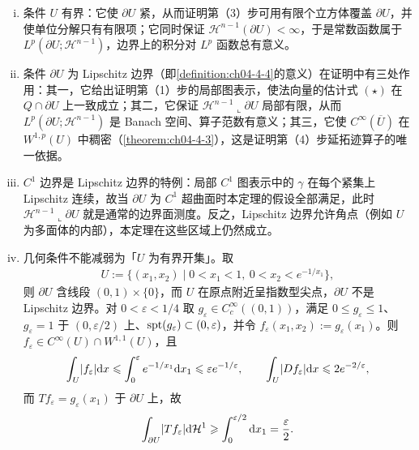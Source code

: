 \documentclass[../../main.tex]{subfiles}%
\begin{document}
\begin{remark}\label{remark:ch04-thm-4-6-条件}
\begin{enumerate}[(i)]
\item 条件 $U$ 有界：它使 $\partial U$ 紧，从而证明第（3）步可用有限个立方体覆盖 $\partial U$，并使单位分解只有有限项；它同时保证 $\mathcal{H}^{n-1}(\partial U)<\infty$，于是常数函数属于 $L^p(\partial U;\mathcal{H}^{n-1})$，边界上的积分对 $L^p$ 函数总有意义。
\item 条件 $\partial U$ 为 Lipschitz 边界（即\cref{definition:ch04-4-4}的意义）在证明中有三处作用：其一，它给出证明第（1）步的局部图表示，使法向量的估计式 $(\star)$ 在 $Q\cap\partial U$ 上一致成立；其二，它保证 $\mathcal{H}^{n-1}\llcorner\partial U$ 局部有限，从而 $L^p(\partial U;\mathcal{H}^{n-1})$ 是 Banach 空间、算子范数有意义；其三，它使 $C^\infty(\overline{U})$ 在 $W^{1,p}(U)$ 中稠密（\cref{theorem:ch04-4-3}），这是证明第（4）步延拓迹算子的唯一依据。 %
\item $C^1$ 边界是 Lipschitz 边界的特例：局部 $C^1$ 图表示中的 $\gamma$ 在每个紧集上 Lipschitz 连续，故当 $\partial U$ 为 $C^1$ 超曲面时本定理的假设全部满足，此时 $\mathcal{H}^{n-1}\llcorner\partial U$ 就是通常的边界面测度。反之，Lipschitz 边界允许角点（例如 $U$ 为多面体的内部），本定理在这些区域上仍然成立。
\item 几何条件不能减弱为「$U$ 为有界开集」。取
\begin{align*}
U:=\bigl\{(x_1,x_2)\mid0<x_1<1,\ 0<x_2<e^{-1/x_1}\bigr\},
\end{align*}
则 $\partial U$ 含线段 $(0,1)\times\{0\}$，而 $U$ 在原点附近呈指数型尖点，$\partial U$ 不是 Lipschitz 边界。对 $0<\varepsilon<1/4$ 取 $g_\varepsilon\in C_c^\infty((0,1))$，满足 $0\leqslant g_\varepsilon\leqslant1$、$g_\varepsilon=1$ 于 $(0,\varepsilon/2)$ 上、$\operatorname{spt}(g_\varepsilon)\subset(0,\varepsilon)$，并令 $f_\varepsilon(x_1,x_2):=g_\varepsilon(x_1)$。则 $f_\varepsilon\in C^\infty(U)\cap W^{1,1}(U)$，且
\begin{align*}
\int_U\lvert f_\varepsilon\rvert\mathrm{d} x\leqslant\int_0^{\varepsilon}e^{-1/x_1}\mathrm{d} x_1\leqslant\varepsilon e^{-1/\varepsilon},
\qquad
\int_U\lvert Df_\varepsilon\rvert\mathrm{d} x\leqslant2e^{-2/\varepsilon},
\end{align*}
而 $Tf_\varepsilon=g_\varepsilon(x_1)$ 于 $\partial U$ 上，故
\begin{align*}
\int_{\partial U}\lvert Tf_\varepsilon\rvert\diff\mathcal{H}^1\geqslant\int_0^{\varepsilon/2}\diff x_1=\frac{\varepsilon}{2}.

\end{align*}
\end{enumerate}
\end{remark}
\end{document}
